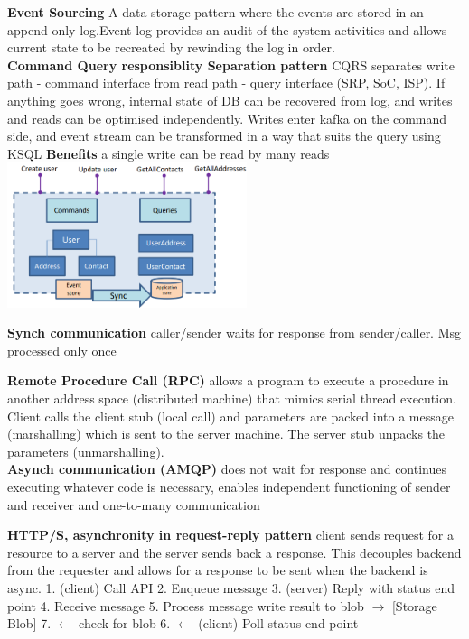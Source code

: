 \documentclass[10pt, landscape]{article}
\begin{document}
\begin{multicols}{4}
\textbf{Event Sourcing}
A data storage pattern where the events are stored in an append-only log.Event log provides an audit of the system activities and allows current state to be recreated by rewinding the log in order. \\

\textbf{Command Query responsiblity Separation pattern}
CQRS separates write path - command interface from read path - query interface (SRP, SoC, ISP). If anything goes wrong, internal state of DB can be recovered from log, and writes and reads can be optimised independently. Writes enter kafka on the command side, and event stream can be transformed in a way that suits the query using KSQL \textbf{Benefits} a single write can be read by many reads \\ 
\includegraphics*[width=7cm]{cqrs event source.png}

\textbf{Synch communication} caller/sender waits for response from sender/caller. Msg processed only once

\textbf{Remote Procedure Call (RPC)}  allows a program to execute a procedure in another address space (distributed machine) that mimics serial thread execution. Client calls the client stub (local call) and parameters are packed into a message (marshalling) which is sent to the server machine. The server stub unpacks the parameters (unmarshalling).\\

\textbf{Asynch communication (AMQP)} does not wait for response and continues executing whatever code is necessary, enables independent functioning of sender and receiver and one-to-many communication

\textbf{HTTP/S, asynchronity in request-reply pattern} client sends request for a resource to a server and the server sends back a response. This decouples backend from the requester and allows for a response to be sent when the backend is async. 1. (client) Call API 2. Enqueue message 3. (server) Reply with status end point 4. Receive message 5. Process message write result to blob $\rightarrow$ [Storage Blob] 7. $\leftarrow$ check for blob 6. $\leftarrow$ (client) Poll status end point \\


\end{multicols}
\end{document}
